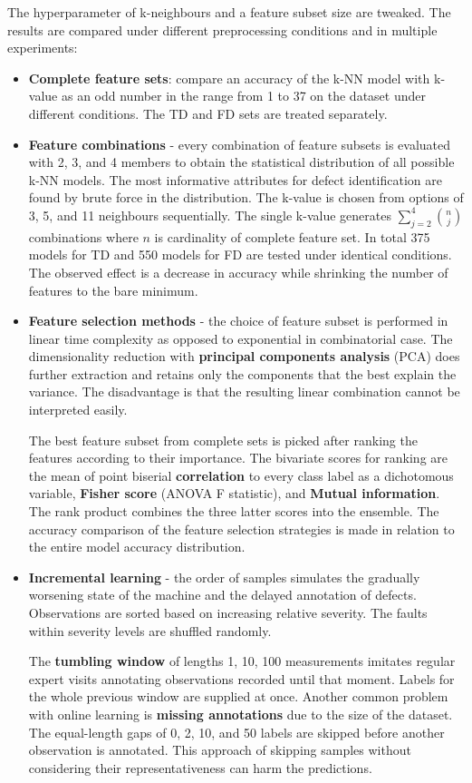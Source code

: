 The hyperparameter of k-neighbours and a feature subset size are tweaked. The results are compared under different preprocessing conditions and in multiple experiments:

\begin{itemize}
\itemsep0pt
\item \textbf{Complete feature sets}: compare an accuracy of the k-NN model with k-value as an odd number in the range from 1 to 37 on the dataset under different conditions. The TD and FD sets are treated separately.

\item \textbf{Feature combinations} - every combination of feature subsets is evaluated with 2, 3, and 4 members to obtain the statistical distribution of all possible k-NN models. The most informative attributes for defect identification are found by brute force in the distribution. The k-value is chosen from options of 3, 5, and 11 neighbours sequentially. The single k-value generates $\sum_{j=2}^{4}{\binom{n}{j}}$ combinations where $n$ is cardinality of complete feature set. In total 375 models for TD and 550 models for FD are tested under identical conditions. The observed effect is a decrease in accuracy while shrinking the number of features to the bare minimum. 

\item \textbf{Feature selection methods} - the choice of feature subset is performed in linear time complexity as opposed to exponential in combinatorial case. The dimensionality reduction with \textbf{principal components analysis} (PCA) does further extraction and retains only the components that the best explain the variance. The disadvantage is that the resulting linear combination cannot be interpreted easily. 

The best feature subset from complete sets is picked after ranking the features according to their importance. The bivariate scores for ranking are the mean of point biserial \textbf{correlation} to every class label as a dichotomous variable, \textbf{Fisher score} (ANOVA F statistic), and \textbf{Mutual information}. The rank product combines the three latter scores into the ensemble. The accuracy comparison of the feature selection strategies is made in relation to the entire model accuracy distribution. 

\item \textbf{Incremental learning} - the order of samples simulates the gradually worsening state of the machine and the delayed annotation of defects. Observations are sorted based on increasing relative severity. The faults within severity levels are shuffled randomly.

The \textbf{tumbling window} of lengths 1, 10, 100 measurements imitates regular expert visits annotating observations recorded until that moment. Labels for the whole previous window are supplied at once. Another common problem with online learning is \textbf{missing annotations} due to the size of the dataset. The equal-length gaps of 0, 2, 10, and 50 labels are skipped before another observation is annotated. This approach of skipping samples without considering their representativeness can harm the predictions.
\end{itemize}

